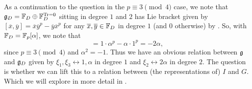 \begin{remark}
  As a continuation to the question in the $p \equiv 3 \pmod{4}$ case, we note that $\mathfrak{g}_{D} = \mathbb{F}_{D} \oplus \mathbb{F}_{D}^{\operatorname{Tr} = 0}$ sitting in degree $1$ and $2$ has Lie bracket given by $[\overline{x},\overline{y}] = \overline{x}\overline{y}^{p} - \overline{y}\overline{x}^{p}$ for any $\overline{x},\overline{y} \in \mathbb{F}_{D}$ in degree $1$ (and $0$ otherwise) by \cite[(6.6)]{Sor}. So, with $\mathbb{F}_{D} = \mathbb{F}_{p}[\alpha]$, we note that
  \begin{equation*}
    [1,\alpha] = 1\cdot\alpha^{p} - \alpha\cdot1^{p} = -2\alpha,
  \end{equation*}
  since $p \equiv 3 \pmod{4}$ and $\alpha^{2} = -1$. Thus we have an obvious relation between $\mathfrak{g}$ and $\mathfrak{g}_{D}$ given by $\xi_{1},\xi_{3} \leftrightarrow 1,\alpha$ in degree $1$ and $\xi_{2} \leftrightarrow 2\alpha$ in degree $2$. The question is whether we can lift this to a relation between (the representations of) $I$ and $G$. Which we will explore in more detail in .

\end{remark}

